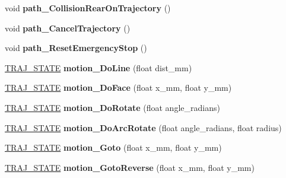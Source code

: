 \begin{DoxyCompactItemize}
void {\bfseries path\+\_\+\+Collision\+Rear\+On\+Trajectory} ()
\item 
\mbox{\label{classAsservDriver_a7f18af77a8524e09f8c9b024d4f0e4b8}} 
void {\bfseries path\+\_\+\+Cancel\+Trajectory} ()
\item 
\mbox{\label{classAsservDriver_aa54769b7bbe83fefa64925aa60089096}} 
void {\bfseries path\+\_\+\+Reset\+Emergency\+Stop} ()
\item 
\mbox{\label{classAsservDriver_a1b4a90efa1f4416161944d9b164be2bc}} 
\hyperlink{path__manager_8h_adb3360abeb29758da93865c8afcb80eb}{T\+R\+A\+J\+\_\+\+S\+T\+A\+TE} {\bfseries motion\+\_\+\+Do\+Line} (float dist\+\_\+mm)
\item 
\mbox{\label{classAsservDriver_af7b023caadc3314c7640c98378829636}} 
\hyperlink{path__manager_8h_adb3360abeb29758da93865c8afcb80eb}{T\+R\+A\+J\+\_\+\+S\+T\+A\+TE} {\bfseries motion\+\_\+\+Do\+Face} (float x\+\_\+mm, float y\+\_\+mm)
\item 
\mbox{\label{classAsservDriver_aca1011c3fb10e594e836ea4ada6b92ff}} 
\hyperlink{path__manager_8h_adb3360abeb29758da93865c8afcb80eb}{T\+R\+A\+J\+\_\+\+S\+T\+A\+TE} {\bfseries motion\+\_\+\+Do\+Rotate} (float angle\+\_\+radians)
\item 
\mbox{\label{classAsservDriver_aabc36af66a38e2fb735e764730328994}} 
\hyperlink{path__manager_8h_adb3360abeb29758da93865c8afcb80eb}{T\+R\+A\+J\+\_\+\+S\+T\+A\+TE} {\bfseries motion\+\_\+\+Do\+Arc\+Rotate} (float angle\+\_\+radians, float radius)
\item 
\mbox{\label{classAsservDriver_a69d5e40538845c81b490a1ac3444847f}} 
\hyperlink{path__manager_8h_adb3360abeb29758da93865c8afcb80eb}{T\+R\+A\+J\+\_\+\+S\+T\+A\+TE} {\bfseries motion\+\_\+\+Goto} (float x\+\_\+mm, float y\+\_\+mm)
\item 
\mbox{\label{classAsservDriver_a96a9ab08074048b626f5f812c82c7342}} 
\hyperlink{path__manager_8h_adb3360abeb29758da93865c8afcb80eb}{T\+R\+A\+J\+\_\+\+S\+T\+A\+TE} {\bfseries motion\+\_\+\+Goto\+Reverse} (float x\+\_\+mm, float y\+\_\+mm)
\item 

\end{DoxyCompactItemize}
